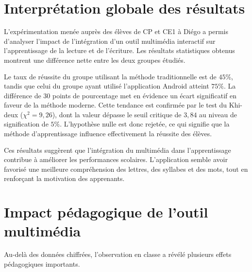 \documentclass[a4paper,oneside,12pt]{book}
\begin{document}
\section{  Interprétation globale des résultats}

L'expérimentation menée auprès des élèves de CP et CE1 à Diégo a permis d'analyser l'impact de l'intégration d'un outil multimédia interactif sur l'apprentissage de la lecture et de l'écriture. Les résultats statistiques obtenus montrent une différence nette entre les deux groupes étudiés.

Le taux de réussite du groupe utilisant la méthode traditionnelle est de \(45\%\), tandis que celui du groupe ayant utilisé l'application Android atteint \(75\%\). La différence de \(30\) points de pourcentage met en évidence un écart significatif en faveur de la méthode moderne. Cette tendance est confirmée par le test du Khi-deux (\(\chi^2 = 9,26\)), dont la valeur dépasse le seuil critique de \(3,84\) au niveau de signification de \(5\%\). L'hypothèse nulle est donc rejetée, ce qui signifie que la méthode d'apprentissage influence effectivement la réussite des élèves.

Ces résultats suggèrent que l'intégration du multimédia dans l'apprentissage contribue à améliorer les performances scolaires. L'application semble avoir favorisé une meilleure compréhension des lettres, des syllabes et des mots, tout en renforçant la motivation des apprenants.


\section{  Impact pédagogique de l'outil multimédia}

Au-delà des données chiffrées, l’observation en classe a révélé plusieurs effets pédagogiques importants.
\end{document}
